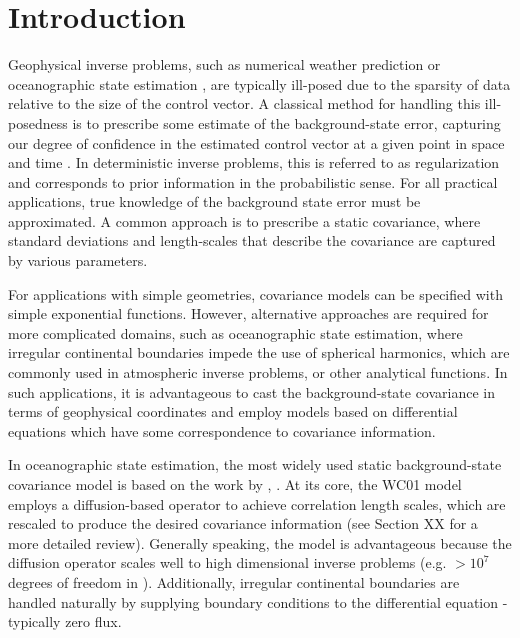\section{Introduction}
\label{sec:intro}

Geophysical inverse problems, such as numerical weather prediction  or
oceanographic state estimation , are typically ill-posed due to the
sparsity of data relative to the size of the control vector.
A classical method for handling this ill-posedness is to prescribe some estimate
of the background-state error, capturing our degree of confidence in the
estimated control vector at a given point in space and time .
In deterministic inverse problems, this is referred to as regularization and
corresponds to prior information in the probabilistic sense.
For all practical applications, true knowledge of the background state error
must be approximated.
A common approach is to prescribe a static covariance, where standard
deviations and length-scales that describe the covariance are captured by
various parameters.

For applications with simple geometries, covariance models can be specified with
simple exponential functions.
However, alternative approaches are required for more complicated domains,
such as oceanographic state estimation,
where irregular continental boundaries impede the use of spherical harmonics,
which are commonly used in atmospheric inverse problems, or other analytical
functions.
In such applications, it is advantageous to cast the background-state covariance
in terms of geophysical coordinates and employ models based on differential
equations which have some correspondence to covariance information.

In oceanographic state estimation, the most widely used static background-state
covariance model is based on the work by
\citet[][WC01 hereafter]{weaver_correlation_2001},
\citep[e.g.][]{nguyen_arctic_2021,forgetECCOv4,moore_regional_2011-1,mazloff_eddy-permitting_2010,gebbie_strategies_2006}.
At its core, the WC01 model employs a diffusion-based operator to achieve
correlation length scales, which are rescaled to produce the desired covariance
information (see Section XX for a more detailed review).
Generally speaking, the model is advantageous because
the diffusion operator scales well to high dimensional inverse problems
(e.g. $>10^7$ degrees of freedom in \citet{forgetECCOv4}).
Additionally, irregular continental boundaries are handled naturally by
supplying boundary conditions to the differential equation - typically zero
flux.

